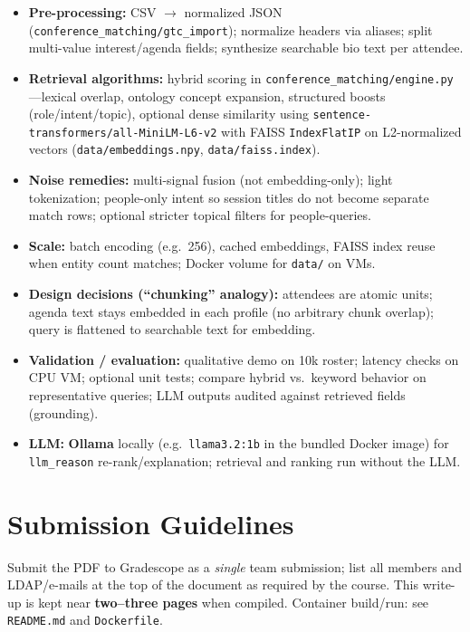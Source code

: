 \documentclass[paper=a4, fontsize=11pt]{scrartcl}
\begin{document}
\begin{itemize}
  \item \textbf{Pre-processing:} CSV \(\rightarrow\) normalized JSON (\texttt{conference\_matching/gtc\_import}); normalize headers via aliases; split multi-value interest/agenda fields; synthesize searchable bio text per attendee.
  \item \textbf{Retrieval algorithms:} hybrid scoring in \texttt{conference\_matching/engine.py}---lexical overlap, ontology concept expansion, structured boosts (role/intent/topic), optional dense similarity using \texttt{sentence-transformers/all-MiniLM-L6-v2} with FAISS \texttt{IndexFlatIP} on L2-normalized vectors (\texttt{data/embeddings.npy}, \texttt{data/faiss.index}).
  \item \textbf{Noise remedies:} multi-signal fusion (not embedding-only); light tokenization; people-only intent so session titles do not become separate match rows; optional stricter topical filters for people-queries.
  \item \textbf{Scale:} batch encoding (e.g.\ 256), cached embeddings, FAISS index reuse when entity count matches; Docker volume for \texttt{data/} on VMs.
  \item \textbf{Design decisions (``chunking'' analogy):} attendees are atomic units; agenda text stays embedded in each profile (no arbitrary chunk overlap); query is flattened to searchable text for embedding.
  \item \textbf{Validation / evaluation:} qualitative demo on 10k roster; latency checks on CPU VM; optional unit tests; compare hybrid vs.\ keyword behavior on representative queries; LLM outputs audited against retrieved fields (grounding).
  \item \textbf{LLM:} \textbf{Ollama} locally (e.g.\ \texttt{llama3.2:1b} in the bundled Docker image) for \texttt{llm\_reason} re-rank/explanation; retrieval and ranking run without the LLM.
\end{itemize}

\section{Submission Guidelines}

Submit the PDF to Gradescope as a \emph{single} team submission; list all members and LDAP/e-mails at the top of the document as required by the course. This write-up is kept near \textbf{two--three pages} when compiled. Container build/run: see \texttt{README.md} and \texttt{Dockerfile}.
\end{document}
